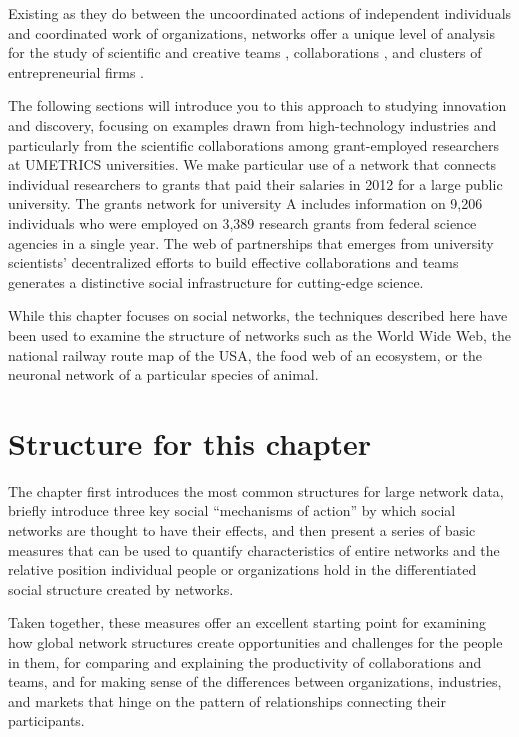 \documentclass[]{krantz}
\begin{document}
Existing as they do between the uncoordinated actions of independent
individuals and coordinated work of organizations, networks offer a
unique level of analysis for the study of scientific and creative teams
\citep{wuchty2007increasing}, collaborations \citep{kabo2015shared}, and
clusters of entrepreneurial firms \citep{owen2004knowledge}.

The following sections will introduce you to this approach to studying
innovation and discovery, focusing on examples drawn from
high-technology industries and particularly from the scientific
collaborations among grant-employed researchers at UMETRICS
universities. We make particular use of a network that connects
individual researchers to grants that paid their salaries in 2012 for a
large public university. The grants network for university A includes
information on 9,206 individuals who were employed on 3,389 research
grants from federal science agencies in a single year. The web of
partnerships that emerges from university scientists' decentralized
efforts to build effective collaborations and teams generates a
distinctive social infrastructure for cutting-edge science.

While this chapter focuses on social networks, the techniques described
here have been used to examine the structure of networks such as the
World Wide Web, the national railway route map of the USA, the food web
of an ecosystem, or the neuronal network of a particular species of
animal.

\section{Structure for this chapter}\label{structure-for-this-chapter}

The chapter first introduces the most common structures for large
network data, briefly introduce three key social ``mechanisms of
action'' by which social networks are thought to have their effects, and
then present a series of basic measures that can be used to quantify
characteristics of entire networks and the relative position individual
people or organizations hold in the differentiated social structure
created by networks.

Taken together, these measures offer an excellent starting point for
examining how global network structures create opportunities and
challenges for the people in them, for comparing and explaining the
productivity of collaborations and teams, and for making sense of the
differences between organizations, industries, and markets that hinge on
the pattern of relationships connecting their participants.
\end{document}
